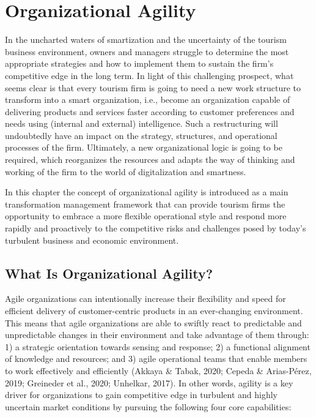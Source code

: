\documentclass[
  letterpaper,
  DIV=11,
  numbers=noendperiod]{scrreprt}
\begin{document}
\hypertarget{organizational-agility-1}{%
\chapter{Organizational Agility}\label{organizational-agility-1}}

In the uncharted waters of smartization and the uncertainty of the
tourism business environment, owners and managers struggle to determine
the most appropriate strategies and how to implement them to sustain the
firm's competitive edge in the long term. In light of this challenging
prospect, what seems clear is that every tourism firm is going to need a
new work structure to transform into a smart organization, i.e., become
an organization capable of delivering products and services faster
according to customer preferences and needs using (internal and
external) intelligence. Such a restructuring will undoubtedly have an
impact on the strategy, structures, and operational processes of the
firm. Ultimately, a new organizational logic is going to be required,
which reorganizes the resources and adapts the way of thinking and
working of the firm to the world of digitalization and smartness.

In this chapter the concept of organizational agility is introduced as a
main transformation management framework that can provide tourism firms
the opportunity to embrace a more flexible operational style and respond
more rapidly and proactively to the competitive risks and challenges
posed by today's turbulent business and economic environment.

\hypertarget{what-is-organizational-agility}{%
\section{What Is Organizational
Agility?}\label{what-is-organizational-agility}}

Agile organizations can intentionally increase their flexibility and
speed for efficient delivery of customer-centric products in an
ever-changing environment. This means that agile organizations are able
to swiftly react to predictable and unpredictable changes in their
environment and take advantage of them through: 1) a strategic
orientation towards sensing and response; 2) a functional alignment of
knowledge and resources; and 3) agile operational teams that enable
members to work effectively and efficiently (Akkaya \& Tabak, 2020;
Cepeda \& Arias-Pérez, 2019; Greineder et al., 2020; Unhelkar, 2017). In
other words, agility is a key driver for organizations to gain
competitive edge in turbulent and highly uncertain market conditions by
pursuing the following four core capabilities:
\end{document}
